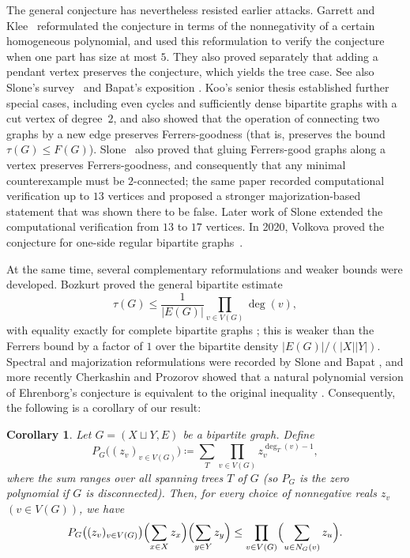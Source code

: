 \documentclass[twoside, reqno]{amsart}
\newtheorem*{corollary}{Corollary}
\theoremstyle{definition}
\theoremstyle{remark}
\begin{document}
The general conjecture has nevertheless resisted earlier attacks. 
Garrett and Klee~\cite{GarrettKlee} reformulated the conjecture in terms 
of the nonnegativity of a certain homogeneous polynomial, and used this 
reformulation to verify the conjecture when one part has size at most $5$. 
They also proved separately that adding a pendant vertex preserves the 
conjecture, which yields the tree case.
See also Slone's survey~\cite{Slone} and Bapat's exposition \cite{Bapat}. 
Koo's senior thesis \cite{Koo} established further special cases, including 
even cycles and sufficiently dense bipartite graphs with a cut vertex of 
degree~$2$, and also showed that the operation of connecting two graphs by 
a new edge preserves Ferrers-goodness (that is, preserves the bound 
$\tau(G)\le F(G)$). Slone~\cite{Slone} also proved that gluing Ferrers-good graphs 
along a vertex preserves Ferrers-goodness, and consequently that any minimal 
counterexample must be $2$-connected; the same paper recorded computational 
verification up to $13$ vertices and proposed a stronger majorization-based 
statement that was shown there to be false. 
Later work of Slone \cite{Slone2} extended the computational verification 
from $13$ to $17$ vertices.
In 2020, Volkova proved the conjecture for one-side regular bipartite 
graphs~\cite{Volkova}.

At the same time, several complementary reformulations and weaker bounds were 
developed. Bozkurt proved the general bipartite estimate
\[
\tau(G)\le \frac{1}{|E(G)|}\prod_{v\in V(G)} \deg(v),
\]
with equality exactly for complete bipartite graphs \cite{Bozkurt}; this is 
weaker than the Ferrers bound by a factor of $1$ over the bipartite density 
$|E(G)|/(|X||Y|)$. Spectral and majorization reformulations were recorded by 
Slone and Bapat \cite{Slone,Bapat}, and more recently Cherkashin and Prozorov 
showed that a natural polynomial version of Ehrenborg's conjecture is 
equivalent to the original inequality \cite[Theorem 2]{CherkashinProzorov}. 
Consequently, the following is a corollary of our result:

\begin{corollary}
Let $G=(X\sqcup Y,E)$ be a bipartite graph. Define
\[
P_G\bigl((z_v)_{v\in V(G)}\bigr)\coloneqq
\sum_T \prod_{v\in V(G)} z_v^{\deg_T(v)-1},
\]
where the sum ranges over all spanning trees $T$ of $G$ (so $P_G$ is the zero polynomial if $G$ is disconnected). Then, for every choice of nonnegative reals $z_v$ $(v\in V(G))$, we have
\[
P_G\bigl((z_v)_{v\in V(G)}\bigr)
\Bigl(\sum_{x\in X} z_x\Bigr)
\Bigl(\sum_{y\in Y} z_y\Bigr)
\le
\prod_{v\in V(G)} \Bigl(\sum_{u\in N_G(v)} z_u\Bigr).
\]
\end{corollary}
\end{document}

